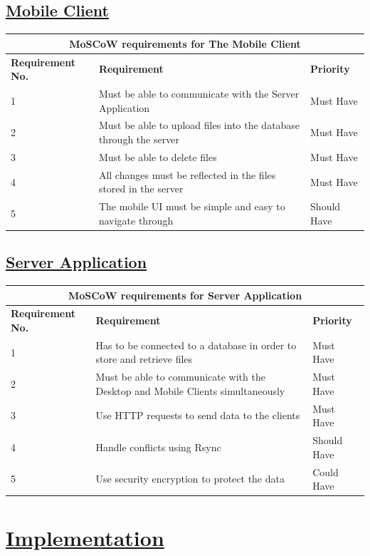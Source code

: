 \documentclass{article}
\begin{document}
\subsection{\underline{Mobile Client}}
\begin{tabular}{|p{3cm}|p{5cm}|p{4cm}|}
\hline
\multicolumn{3}{|c|}{\textbf{MoSCoW requirements for The Mobile Client}} \\
\hline
\textbf{Requirement No.} & \textbf{Requirement} & \textbf{Priority}\\
\hline
1 & Must be able to communicate with the Server Application & Must Have \\
\hline
2 & Must be able to upload files into the database through the server & Must Have \\
\hline
3 & Must be able to delete files & Must Have \\
\hline
4 & All changes must be reflected in the files stored in the server & Must Have \\
\hline
5 & The mobile UI must be simple and easy to navigate through & Should Have \\
\hline
\end{tabular}

\subsection{\underline{Server Application}}

\begin{tabular}{|p{3cm}|p{5cm}|p{4cm}|}
\hline
\multicolumn{3}{|c|}{\textbf{MoSCoW requirements for Server Application}} \\
\hline
\textbf{Requirement No.} & \textbf{Requirement} & \textbf{Priority}\\
\hline
1 & Has to be connected to a database in order to store and retrieve files & Must Have \\
\hline
2 & Must be able to communicate with the Desktop and Mobile Clients simultaneously & Must Have \\
\hline
3 & Use HTTP requests to send data to the clients & Must Have \\
\hline
4 & Handle conflicts using Rsync & Should Have \\
\hline
5 & Use security encryption to protect the data & Could Have\\
\hline
\end{tabular}

\section{\underline{Implementation}}
\end{document}
